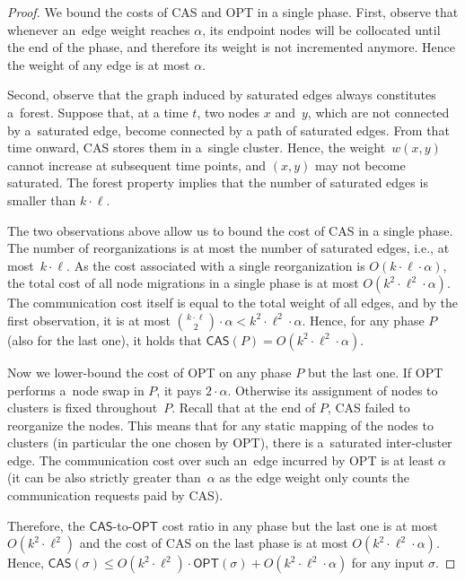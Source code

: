 \documentclass[a4paper,USenglish]{lipics-v2019}
\newcommand{\OPT}{\textsf{OPT}\xspace}
\newcommand{\DET}{\textsf{CAS}\xspace}
\begin{document}
\begin{proof}
We bound the costs of \DET and \OPT in a single phase. First, observe that
whenever an~edge weight reaches $\alpha$, its endpoint nodes will be collocated 
until the end of the phase, and therefore its weight is not
incremented anymore. Hence the weight of any edge is at most $\alpha$.

Second, observe that the graph induced by saturated edges always constitutes 
a~forest. Suppose that, at a time $t$,
two nodes $x$ and~$y$, which are not
connected by a~saturated edge, become connected by a path of saturated edges.
From that time onward, \DET stores them in a~single cluster. Hence, the
weight~$w(x,y)$ cannot increase at subsequent time points, and $(x,y)$ may
not become saturated. The forest property implies that the number of saturated
edges is smaller than $k \cdot \ell$.

The two observations above allow us to bound the cost of \DET in a single
phase. The number of reorganizations is at most the number of saturated edges,
i.e., at most~$k \cdot \ell$. As the cost associated with a single
reorganization is $O(k \cdot \ell \cdot \alpha)$, the total cost of all node
migrations in a single phase is at most $O(k^2 \cdot \ell^2 \cdot \alpha)$.
The communication cost itself is equal to the total weight of all edges, and
by the first observation, it is at most $\binom{k \cdot \ell}{2}
\cdot \alpha < k^2 \cdot \ell^2 \cdot \alpha$. Hence, for any phase $P$ (also
for the last one), it holds that $\DET(P) = O(k^2 \cdot \ell^2 \cdot \alpha)$.

Now we lower-bound the cost of \OPT on any phase $P$ but the last one. If \OPT
performs a~node swap in $P$, it pays $2 \cdot \alpha$. Otherwise its assignment of
nodes to clusters is fixed throughout~$P$. Recall that at the end of $P$, \DET
failed to reorganize the nodes. This means that for any static mapping of the
nodes to clusters (in particular the one chosen by \OPT), there is a~saturated inter-cluster edge. The communication cost over such an~edge incurred
by \OPT is at least $\alpha$ (it can be also strictly greater than~$\alpha$ as
the edge weight only counts the communication requests paid by \DET).

Therefore, the $\DET$-to-$\OPT$ cost ratio in any phase but the last one is at
most $O(k^2 \cdot \ell^2)$ and the cost of \DET on the last phase is at
most $O(k^2 \cdot \ell^2 \cdot \alpha)$. Hence,
$\DET(\sigma) \leq O(k^2 \cdot \ell^2) \cdot \OPT(\sigma) + O(k^2 \cdot
\ell^2 \cdot \alpha)$ for any input $\sigma$.
\end{proof}
\end{document}
